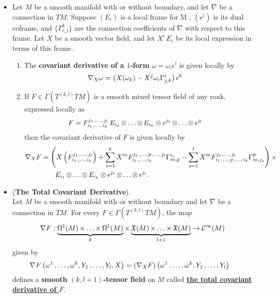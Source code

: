 \documentclass[11pt]{article}
\begin{document}
\begin{itemize}
\item \begin{proposition}
Let $M$ be a smooth manifold with or without boundary, and let $\nabla$ be a connection in $TM$. Suppose  $(E_i)$ is a local frame for M , $(\epsilon^j)$ is its dual coframe, and $\{\Gamma_{i,j}^{k}\}$ are the connection coefficients of $\nabla$ with respect to this frame. Let $X$ be a smooth vector field, and let $X^i\,E_i$ be its local expression in terms of this frame.
\begin{enumerate}
\item The \textbf{covariant derivative of a $1$-form} $\omega = \omega_i \epsilon^i$ is given locally by
\begin{align}
\nabla_{X}{\omega} &= \left(X(\omega_k) - X^{j}\omega_{i}\Gamma_{j,k}^{i}\right)\epsilon^{k} \label{eqn: connection_1_form_coordinate}
\end{align}
\item If $F\in \Gamma(T^{(k, l)}TM)$ is a smooth mixed tensor field of any rank, expressed locally as
\begin{align*}
F &= F_{i_1 \,{,}\ldots{,}\, i_k}^{j_1 \,{,}\ldots{,}\, j_l}\,E_{i_1} \,{\otimes}\ldots{\otimes}\, E_{i_k} \otimes \epsilon^{j_1} \,{\otimes}\ldots{\otimes}\, \epsilon^{j_l}
\end{align*} then the covariant derivative of $F$ is given locally by
\begin{align*}
\nabla_{X}{F} &= \left(X\left(F_{i_1 \,{,}\ldots{,}\, i_k}^{j_1 \,{,}\ldots{,}\, j_l}\right) + \sum_{s=1}^{k}X^{m}F_{i_1 \,{,}\ldots{,}\, i_k}^{j_1 \,{,}\ldots{,}\, p \,{,}\ldots{,}\,  j_l}\Gamma_{m,p}^{i_s} -   \sum_{s=1}^{l}X^{m}F_{i_1  \,{,}\ldots{,}\, p \,{,}\ldots{,}\, i_k}^{j_1 \,{,}\ldots{,}\,  j_l}\Gamma_{m, j_s}^{p} \right) \times\\
&\qquad E_{i_1} \,{\otimes}\ldots{\otimes}\, E_{i_k} \otimes \epsilon^{j_1} \,{\otimes}\ldots{\otimes}\, \epsilon^{j_l}.
\end{align*}
\end{enumerate}
\end{proposition}



\item \begin{proposition} (\textbf{The Total Covariant Derivative}). \citep{lee2018introduction}\\
Let $M$ be a smooth manifold with or without boundary and let $\nabla$ be a connection in $TM$. For every $F\in \Gamma(T^{(k,l)}TM)$,  the map
\begin{align*}
\nabla F: \underbrace{\Omega^1(M) \,{\times}\ldots{\times}\, \Omega^1(M)}_{k} \times \underbrace{{\mathfrak X}(M) \,{\times}\ldots{\times}\, {\mathfrak X}(M)}_{l+1} \rightarrow {\mathcal C}^{\infty}(M)
\end{align*} given by
\begin{align}
\nabla_{}{F}\left(\omega^1 \,{,}\ldots{,}\, \omega^k, Y_1 \,{,}\ldots{,}\, Y_l, X\right)&= (\nabla_{X}{F})\left(\omega^1 \,{,}\ldots{,}\, \omega^k, Y_1 \,{,}\ldots{,}\, Y_l\right)\label{eqn: total_covariant_derivatives_tensor}
\end{align} defines a \textbf{smooth $(k, l+1)$-tensor field} on $M$ called \underline{\textbf{the total covariant derivative of $F$}}.
\end{proposition}


\end{itemize}
\end{document}
